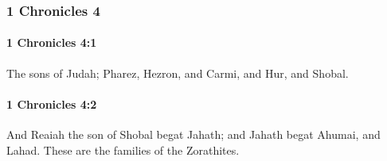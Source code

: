 	\subsubsection{1 Chronicles 4} %
		\label{1CHRONICLES-4}

		\paragraph{1 Chronicles 4:1} %
			\label{1CHRONICLES-4-1}

			The sons of Judah; Pharez, Hezron, and Carmi, and Hur, and Shobal.


		\paragraph{1 Chronicles 4:2} %
			\label{1CHRONICLES-4-2}

			And Reaiah the son of Shobal begat Jahath; and Jahath begat Ahumai, and Lahad. These are the families of the Zorathites.

